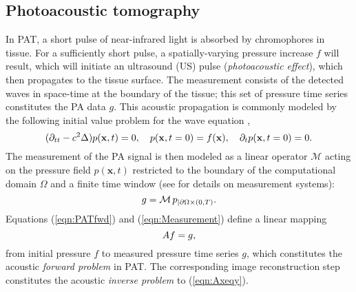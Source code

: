 \documentclass[runningheads]{llncs}
\newcommand{\bx}{\mathbf{x}}
\newcommand{\Simon}[1]{\textcolor{magenta}{\textbf{Simon:} #1}}
\begin{document}
\subsection{Photoacoustic tomography}
In PAT, a short pulse of near-infrared light is absorbed by 
chromophores in tissue. For a sufficiently short pulse, a spatially-varying pressure increase $f$ will result, which will initiate an 
ultrasound (US) pulse (\textit{photoacoustic effect}), which then propagates to the tissue surface. The measurement consists of the detected waves in space-time at the boundary of the tissue; this set of pressure time series constitutes the PA data $g$. 
This acoustic propagation is
commonly modeled by the following initial value problem for the wave equation \cite{Cox2005},
\vspace{-0.5em}
\begin{equation}
(\partial_{tt} - c^2 \Delta) p(\bx,t) = 0, \quad p(\bx,t = 0) = f(\bx), \quad \partial_t p(\bx,t = 0) = 0.\label{eqn:PATfwd}
\vspace{-0.5em}
\end{equation}
The measurement of the PA signal is then modeled as a linear operator $\mathcal{M}$ acting on the pressure field $p(\bx,t)$ restricted to the boundary of the computational domain $\Omega$ and a finite time window (see \cite{Beard:2011if,LuRa13} for details on measurement systems):
\vspace{-0.5em}
\begin{equation}
g = \mathcal{M} \, p_{|\partial \Omega \times (0,T)}. \label{eqn:Measurement}
\vspace{-0.5em}
\end{equation}
Equations (\ref{eqn:PATfwd}) and (\ref{eqn:Measurement}) define a linear mapping 
\vspace{-0.5em}
\begin{equation}
Af=g,
\label{eqn:Axeqy}
\vspace{-0.5em}
\end{equation}
from initial pressure $f$ to measured pressure time series $g$, which constitutes the acoustic \emph{forward problem} in PAT. The corresponding image reconstruction step constitutes the acoustic \emph{inverse problem} to (\ref{eqn:Axeqy}). 
\end{document}
